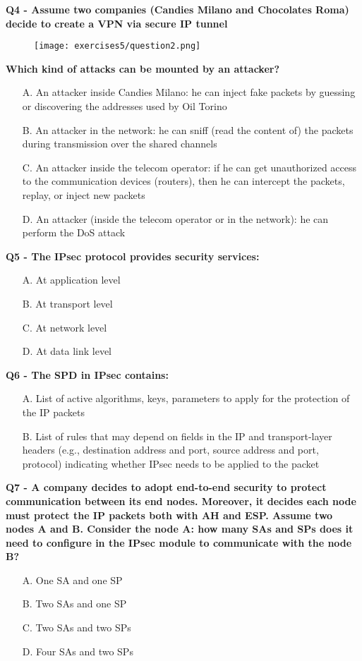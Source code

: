 \textbf{Q4 - Assume two companies (Candies Milano and Chocolates Roma) decide to create a VPN via secure IP tunnel}
\begin{figure}[h]
    \centering
    \texttt{[image: exercises5/question2.png]}
\end{figure}
\textbf{Which kind of attacks can be mounted by an attacker?}
\begin{itemize}
    \item[A.] An attacker inside Candies Milano: he can inject fake packets by guessing or discovering the addresses used by Oil Torino
    \item[B.] An attacker in the network: he can sniff (read the content of) the packets during transmission over the shared channels
    \item[C.] An attacker inside the telecom operator: if he can get unauthorized access to the communication devices (routers), then he can intercept the packets, replay, or inject new packets
    \item[D.] An attacker (inside the telecom operator or in the network): he can perform the DoS attack
\end{itemize}

\textbf{Q5 - The IPsec protocol provides security services:}
\begin{itemize}
    \item[A.] At application level
    \item[B.] At transport level
    \item[C.] At network level
    \item[D.] At data link level
\end{itemize}

\textbf{Q6 - The SPD in IPsec contains:}
\begin{itemize}
    \item[A.] List of active algorithms, keys, parameters to apply for the protection of the IP packets
    \item[B.] List of rules that may depend on fields in the IP and transport-layer headers (e.g., destination address and port, source address and port, protocol) indicating whether IPsec needs to be applied to the packet
\end{itemize}

\textbf{Q7 - A company decides to adopt end-to-end security to protect communication between its end nodes. Moreover, it decides each node must protect the IP packets both with AH and ESP. Assume two nodes A and B. Consider the node A: how many SAs and SPs does it need to configure in the IPsec module to communicate with the node B?}
\begin{itemize}
    \item[A.] One SA and one SP
    \item[B.] Two SAs and one SP
    \item[C.] Two SAs and two SPs
    \item[D.] Four SAs and two SPs
\end{itemize}


